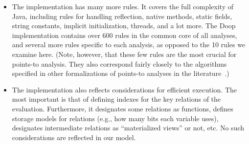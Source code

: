 \begin{itemize}
\item The implementation has many more rules. It covers the full
  complexity of Java, including rules for handling reflection, native
  methods, static fields, string constants, implicit initialization,
  threads, and a lot more. The Doop
  implementation
  contains over 600 rules in the common core of all analyses, and
  several more rules specific to each analysis, as opposed to the 10
  rules we examine here. (Note, however, that these few rules are the
  most crucial for points-to analysis. They also correspond fairly
  closely to the algorithms specified in other formalizations of
  points-to analyses in the
  literature~\cite{kcfa-pldi10,pointsto-popl11}.)

\item The implementation also reflects considerations for efficient
  execution. The most important is that of defining indexes for the
  key relations of the evaluation. Furthermore, it designates some
  relations as functions, defines storage models for relations (e.g.,
  how many bits each variable uses), designates intermediate relations
  as ``materialized views'' or not, etc. No such considerations are
  reflected in our model.
\end{itemize}



